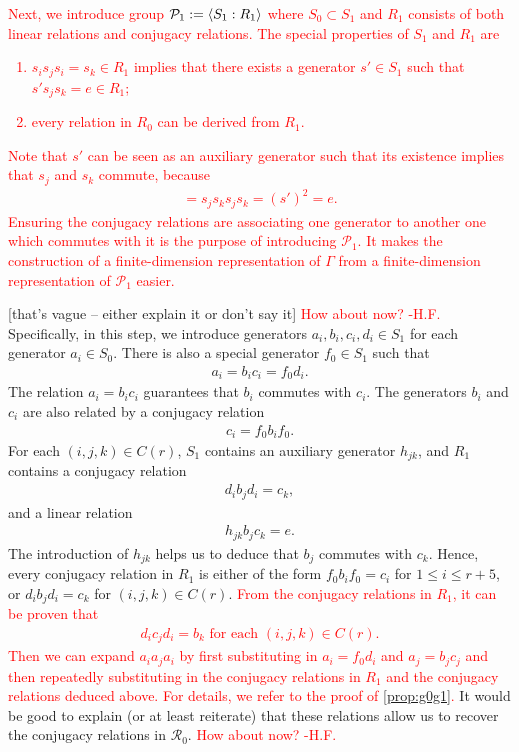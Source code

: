 \documentclass[11pt,letterpaper]{article}
\DeclarePairedDelimiter{\ip}{\langle}{\rangle}
\newcommand{\1}{\mathbb{1}}
\newcommand{\Pg}{\mathcal{P}}
\def\carl#1{{\color{blue} #1}}
\newcommand{\hf}[1]{\textcolor{red}{#1}}
\newcommand{\hfc}[1]{\textcolor{red}{#1 -H.F.}}
\theoremstyle{definition}
\begin{document}
\hf{Next, we introduce group $\Pg_1 := \ip{S_1: R_1}$ where $S_0 \subset S_1$
and $R_1$ consists of both linear relations and conjugacy relations.
The special properties of $S_1$ and $R_1$ are
\begin{enumerate}
    \item $s_is_js_i = s_k \in R_1$ implies that there exists a generator
$s' \in S_1$ such that $s' s_j s_k = e \in R_1$;
    \item every relation in $R_0$ can be derived from $R_1$.
\end{enumerate}
Note that $s'$ can be seen as an auxiliary generator such that
its existence implies that $s_j$ and $s_k$ commute, because
\begin{align*}
    [s_j, s_k] = s_j s_k s_j s_k = (s')^2 = e.
\end{align*}
Ensuring the conjugacy relations are associating one generator to another one which 
commutes with it is the purpose of introducing $\Pg_1$. 
It makes the construction of a finite-dimension representation of $\Gamma$ from
a finite-dimension representation of $\Pg_1$ easier.}
\carl{[that's vague -- either explain it or don't say it]}
\hfc{How about now?} 
Specifically, in this step, we introduce generators $a_i, b_i, c_i, d_i \in S_1$
for each generator $a_i \in S_0$.
There is also a special generator $f_0 \in S_1$ such that
\begin{align*}
    a_i = b_ic_i = f_0d_i. 
\end{align*}
The relation $a_i = b_ic_i$ guarantees that $b_i$ commutes
with $c_i$.
The generators $b_i$ and $c_i$ are also related by a conjugacy relation
\begin{align*}
    c_i = f_0 b_i f_0. 
\end{align*}
For each $(i,j,k) \in C(r)$, 
$S_1$ contains an auxiliary generator $h_{jk}$, and
$R_1$ 
contains a conjugacy relation 
\begin{align*}
    d_ib_jd_i = c_k,
\end{align*}
and a linear relation
\begin{align*}
    h_{jk}b_jc_k = e.
\end{align*}
The introduction of $h_{jk}$ helps us to deduce that 
$b_j$ commutes with $c_k$.
Hence, every conjugacy relation in $R_1$ is either of the form
$f_0b_if_0 = c_i$ for $1 \leq i \leq r+5$, or
$d_ib_jd_i = c_k$ for $(i,j,k) \in C(r)$.
\hf{From the conjugacy relations in $R_1$, it can be proven that
\begin{align*}
    d_ic_jd_i = b_k \text{ for each } (i,j,k) \in C(r).
\end{align*}
Then we can expand $a_ia_ja_i$ by first substituting in $a_i = f_0 d_i$ and $a_j = b_jc_j$ and then repeatedly substituting in the conjugacy relations in $R_1$ and 
the conjugacy relations deduced above. For details, we refer to the 
proof of \cref{prop:g0g1}.}
\carl{It would be good to explain (or at least reiterate) that these relations allow us to recover the conjugacy relations in $\mathcal{R}_0$.}
\hfc{How about now?}
\end{document}
